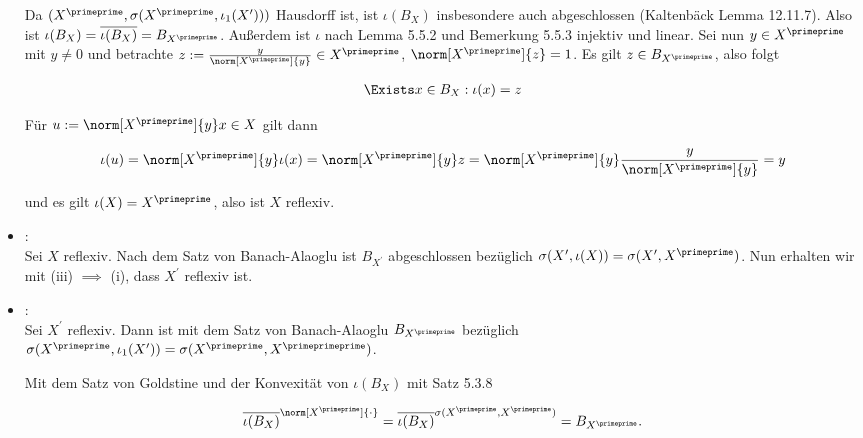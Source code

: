 \begin{solution}
\begin{itemize}

  Da $(X^\primeprime, \sigma(X^\primeprime, \iota_1(X^\prime)))$ Hausdorff ist, ist $\iota(B_X)$ insbesondere auch abgeschlossen (Kaltenbäck Lemma 12.11.7).
  Also ist $\iota(B_X) = \overline{\iota(B_X)} = B_{X^\primeprime}$.
  Außerdem ist $\iota$ nach Lemma 5.5.2 und Bemerkung 5.5.3 injektiv und linear.
  Sei nun $y \in X^\primeprime$ mit $y \neq 0$ und betrachte $z := \frac{y}{\norm[X^\primeprime]{y}} \in X^\primeprime$, $\norm[X^\primeprime]{z} = 1$.
  Es gilt $z \in B_{X^\primeprime}$, also folgt

  \begin{align*}
    \Exists x \in B_X:
    \iota(x) = z
  \end{align*}

  Für $u := \norm[X^\primeprime]{y} x \in X$ gilt dann

  \begin{align*}
    \iota(u)
    =
    \norm[X^\primeprime]{y} \iota(x)
    =
    \norm[X^\primeprime]{y} z
    =
    \norm[X^\primeprime]{y} \frac{y}{\norm[X^\primeprime]{y}}
    = y
  \end{align*}

  und es gilt $\iota(X) = X^\primeprime$, also ist $X$ reflexiv.

  \item
  : \\

  Sei $X$ reflexiv.
  Nach dem Satz von Banach-Alaoglu ist $B_{X^\prime}$ abgeschlossen bezüglich $\sigma(X^\prime, \iota(X)) = \sigma(X^\prime, X^\primeprime)$.
  Nun erhalten wir mit (iii) $\implies$ (i), dass $X^\prime$ reflexiv ist.

  \item
  : \\

  Sei $X^\prime$ reflexiv.
  Dann ist mit dem Satz von Banach-Alaoglu $B_{X^\primeprime}$ bezüglich $\sigma(X^\primeprime, \iota_1(X^\prime)) = \sigma(X^\primeprime, X^\primeprimeprime)$.


  Mit dem Satz von Goldstine und der Konvexität von $\iota(B_X)$ mit Satz 5.3.8

  \begin{align*}
    \overline{\iota(B_X)}^{\norm[X^\primeprime]{\cdot}}
    =
    \overline{\iota(B_X)}^{\sigma(X^\primeprime, X^\primeprime)}
    =
    B_{X^\primeprime}.
  \end{align*}


\end{itemize}
\end{solution}
